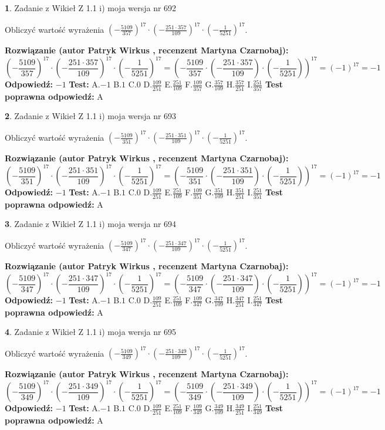 \documentclass[12pt, a4paper]{article}
\theoremstyle{definition} %
\newtheorem{zad}{}
\newcommand{\zadStart}[1]{\begin{zad}#1\newline}
\newcommand{\zadStop}{\end{zad}}
\newcommand{\rozwStart}[2]{\noindent \textbf{Rozwiązanie (autor #1 , recenzent #2): }\newline}
\newcommand{\rozwStop}{\newline}
\newcommand{\odpStart}{\noindent \textbf{Odpowiedź:}\newline}
\newcommand{\odpStop}{\newline}
\newcommand{\testStart}{\noindent \textbf{Test:}\newline}
\newcommand{\testStop}{\newline}
\newcommand{\kluczStart}{\noindent \textbf{Test poprawna odpowiedź:}\newline}
\newcommand{\kluczStop}{\newline}
\begin{document}
\zadStart{Zadanie z Wikieł Z 1.1 i) moja wersja nr 692}

Obliczyć wartość wyrażenia $(-\frac{5109}{357})^{17} \cdot (-\frac{251 \cdot 357}{109})^{17} \cdot (-\frac{1}{5251})^{17}$.
\zadStop
\rozwStart{Patryk Wirkus}{Martyna Czarnobaj}
$$(-\frac{5109}{357})^{17} \cdot (-\frac{251 \cdot 357}{109})^{17} \cdot (-\frac{1}{5251})^{17} = (-\frac{5109}{357} \cdot (-\frac{251 \cdot 357}{109}) \cdot (-\frac{1}{5251}))^{17} = (-1)^{17} = -1$$
\rozwStop
\odpStart
$-1$
\odpStop
\testStart
A.$-1$ B.$1$ C.$0$ D.$\frac{109}{251}$ E.$\frac{251}{109}$
F.$\frac{109}{357}$ G.$\frac{357}{109}$
H.$\frac{357}{251}$
I.$\frac{251}{357}$
\testStop
\kluczStart
A
\kluczStop



\zadStart{Zadanie z Wikieł Z 1.1 i) moja wersja nr 693}

Obliczyć wartość wyrażenia $(-\frac{5109}{351})^{17} \cdot (-\frac{251 \cdot 351}{109})^{17} \cdot (-\frac{1}{5251})^{17}$.
\zadStop
\rozwStart{Patryk Wirkus}{Martyna Czarnobaj}
$$(-\frac{5109}{351})^{17} \cdot (-\frac{251 \cdot 351}{109})^{17} \cdot (-\frac{1}{5251})^{17} = (-\frac{5109}{351} \cdot (-\frac{251 \cdot 351}{109}) \cdot (-\frac{1}{5251}))^{17} = (-1)^{17} = -1$$
\rozwStop
\odpStart
$-1$
\odpStop
\testStart
A.$-1$ B.$1$ C.$0$ D.$\frac{109}{251}$ E.$\frac{251}{109}$
F.$\frac{109}{351}$ G.$\frac{351}{109}$
H.$\frac{351}{251}$
I.$\frac{251}{351}$
\testStop
\kluczStart
A
\kluczStop



\zadStart{Zadanie z Wikieł Z 1.1 i) moja wersja nr 694}

Obliczyć wartość wyrażenia $(-\frac{5109}{347})^{17} \cdot (-\frac{251 \cdot 347}{109})^{17} \cdot (-\frac{1}{5251})^{17}$.
\zadStop
\rozwStart{Patryk Wirkus}{Martyna Czarnobaj}
$$(-\frac{5109}{347})^{17} \cdot (-\frac{251 \cdot 347}{109})^{17} \cdot (-\frac{1}{5251})^{17} = (-\frac{5109}{347} \cdot (-\frac{251 \cdot 347}{109}) \cdot (-\frac{1}{5251}))^{17} = (-1)^{17} = -1$$
\rozwStop
\odpStart
$-1$
\odpStop
\testStart
A.$-1$ B.$1$ C.$0$ D.$\frac{109}{251}$ E.$\frac{251}{109}$
F.$\frac{109}{347}$ G.$\frac{347}{109}$
H.$\frac{347}{251}$
I.$\frac{251}{347}$
\testStop
\kluczStart
A
\kluczStop



\zadStart{Zadanie z Wikieł Z 1.1 i) moja wersja nr 695}

Obliczyć wartość wyrażenia $(-\frac{5109}{349})^{17} \cdot (-\frac{251 \cdot 349}{109})^{17} \cdot (-\frac{1}{5251})^{17}$.
\zadStop
\rozwStart{Patryk Wirkus}{Martyna Czarnobaj}
$$(-\frac{5109}{349})^{17} \cdot (-\frac{251 \cdot 349}{109})^{17} \cdot (-\frac{1}{5251})^{17} = (-\frac{5109}{349} \cdot (-\frac{251 \cdot 349}{109}) \cdot (-\frac{1}{5251}))^{17} = (-1)^{17} = -1$$
\rozwStop
\odpStart
$-1$
\odpStop
\testStart
A.$-1$ B.$1$ C.$0$ D.$\frac{109}{251}$ E.$\frac{251}{109}$
F.$\frac{109}{349}$ G.$\frac{349}{109}$
H.$\frac{349}{251}$
I.$\frac{251}{349}$
\testStop
\kluczStart
A
\kluczStop
\end{document}
